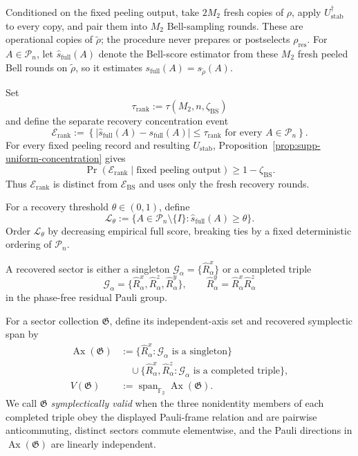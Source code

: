 \documentclass[
  aps,
  prx,
  reprint,
  superscriptaddress,
  amsmath,
  amssymb,
  nofootinbib,
  longbibliography
]{revtex4-2}
\newcommand{\Span}{\operatorname{span}}
\newcommand{\Pc}{\mathcal{P}}
\newcommand{\Fc}{\mathbb{F}_2}
\begin{document}
Conditioned on the fixed peeling output, take $2M_2$ fresh copies of
$\rho$, apply $U_{\mathrm{stab}}^\dagger$ to every copy, and pair them into
$M_2$ Bell-sampling rounds.  These are operational copies of $\tilde\rho$;
the procedure never prepares or postselects $\rho_{\mathrm{res}}$.
For $A\in\Pc_n$, let $\hat s_{\mathrm{full}}(A)$ denote the Bell-score
estimator from these $M_2$ fresh peeled Bell rounds on $\tilde\rho$, so it
estimates $s_{\mathrm{full}}(A)=s_{\tilde\rho}(A)$.

Set
\begin{equation}
\tau_{\mathrm{rank}}
:=
\tau(M_2,n,\zeta_{\mathrm{BS}})
\end{equation}
and define the separate recovery concentration event
\begin{equation}
\mathcal E_{\mathrm{rank}}
:=
\left\{
|\hat s_{\mathrm{full}}(A)-s_{\mathrm{full}}(A)|
\le
\tau_{\mathrm{rank}}
\text{ for every }A\in\Pc_n
\right\}.
\label{eq:supp-block-uniform-score-event}
\end{equation}
For every fixed peeling record and resulting $U_{\mathrm{stab}}$,
Proposition~\ref{prop:supp-uniform-concentration} gives
\begin{equation}
\Pr(\mathcal E_{\mathrm{rank}}\mid\text{fixed peeling output})
\ge
1-\zeta_{\mathrm{BS}}.
\end{equation}
Thus $\mathcal E_{\mathrm{rank}}$ is distinct from
$\mathcal E_{\mathrm{BS}}$ and uses only the fresh recovery rounds.

For a recovery threshold $\theta\in(0,1)$, define
\begin{equation}
\mathcal L_\theta
:=
\{A\in\Pc_n\setminus\{I\}:\hat s_{\mathrm{full}}(A)\ge\theta\}.
\end{equation}
Order $\mathcal L_\theta$ by decreasing empirical full score, breaking
ties by a fixed deterministic ordering of $\Pc_n$.

A recovered sector is either a singleton
$\mathcal G_\alpha=\{\hat R_\alpha^x\}$ or a completed triple
\begin{equation}
\mathcal G_\alpha
=
\{\hat R_\alpha^x,\hat R_\alpha^z,\hat R_\alpha^y\},
\qquad
\hat R_\alpha^y
=
\hat R_\alpha^x\hat R_\alpha^z
\end{equation}
in the phase-free residual Pauli group.

For a sector collection $\mathfrak G$, define its independent-axis set and
recovered symplectic span by
\begin{equation}
\begin{aligned}
\operatorname{Ax}(\mathfrak G)
&:=
\{\hat R_\alpha^x:\mathcal G_\alpha\text{ is a singleton}\}
\\
&\quad\cup
\{\hat R_\alpha^x,\hat R_\alpha^z:
\mathcal G_\alpha\text{ is a completed triple}\},
\\
V(\mathfrak G)
&:=
\Span_{\Fc}\operatorname{Ax}(\mathfrak G).
\end{aligned}
\end{equation}
We call $\mathfrak G$ \emph{symplectically valid} when the three
nonidentity members of each completed triple obey the displayed
Pauli-frame relation and are pairwise anticommuting, distinct sectors
commute elementwise, and the Pauli directions in
$\operatorname{Ax}(\mathfrak G)$ are linearly independent.
\end{document}
